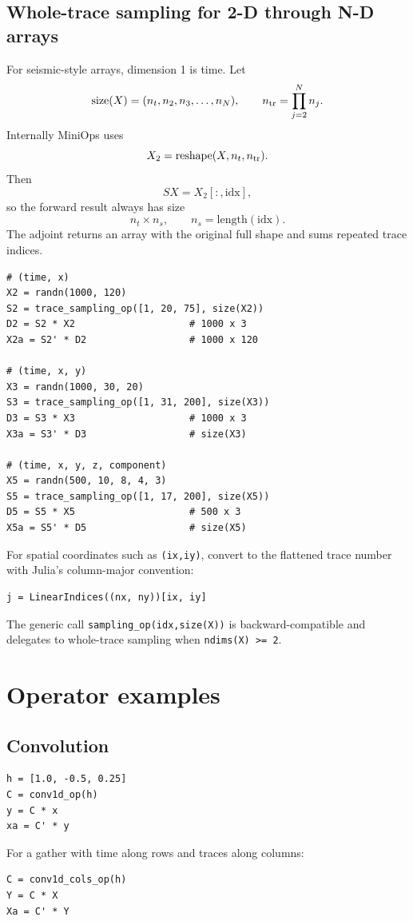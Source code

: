 \documentclass[11pt]{article}
\begin{document}
\subsection{Whole-trace sampling for 2-D through N-D arrays}
For seismic-style arrays, dimension 1 is time.  Let
\[
   \mathrm{size}(X)=(n_t,n_2,n_3,\ldots,n_N),
   \qquad n_{\rm tr}=\prod_{j=2}^{N} n_j.
\]
Internally MiniOps uses
\[
   X_2 = \operatorname{reshape}(X,n_t,n_{\rm tr}).
\]
Then
\[
   SX = X_2[:,\mathrm{idx}],
\]
so the forward result always has size
\[
   n_t\times n_s, \qquad n_s=\mathrm{length}(\mathrm{idx}).
\]
The adjoint returns an array with the original full shape and sums repeated
trace indices.

\begin{verbatim}
# (time, x)
X2 = randn(1000, 120)
S2 = trace_sampling_op([1, 20, 75], size(X2))
D2 = S2 * X2                    # 1000 x 3
X2a = S2' * D2                  # 1000 x 120

# (time, x, y)
X3 = randn(1000, 30, 20)
S3 = trace_sampling_op([1, 31, 200], size(X3))
D3 = S3 * X3                    # 1000 x 3
X3a = S3' * D3                  # size(X3)

# (time, x, y, z, component)
X5 = randn(500, 10, 8, 4, 3)
S5 = trace_sampling_op([1, 17, 200], size(X5))
D5 = S5 * X5                    # 500 x 3
X5a = S5' * D5                  # size(X5)
\end{verbatim}

For spatial coordinates such as \texttt{(ix,iy)}, convert to the flattened
trace number with Julia's column-major convention:
\begin{verbatim}
j = LinearIndices((nx, ny))[ix, iy]
\end{verbatim}
The generic call \texttt{sampling\_op(idx,size(X))} is backward-compatible
and delegates to whole-trace sampling when \texttt{ndims(X) >= 2}.

\section{Operator examples}
\subsection{Convolution}
\begin{verbatim}
h = [1.0, -0.5, 0.25]
C = conv1d_op(h)
y = C * x
xa = C' * y
\end{verbatim}

For a gather with time along rows and traces along columns:
\begin{verbatim}
C = conv1d_cols_op(h)
Y = C * X
Xa = C' * Y
\end{verbatim}
\end{document}
